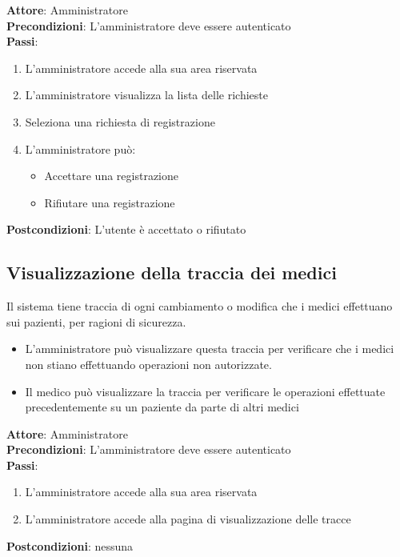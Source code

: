 \documentclass[a4paper]{article}
\begin{document}
\begin{mdframed}
	\textbf{Attore}: Amministratore\\
	\textbf{Precondizioni}: L'amministratore deve essere autenticato\\
	\textbf{Passi}: 
	\begin{enumerate}[nosep]
	  \item L'amministratore accede alla sua area riservata
	  \item L'amministratore visualizza la lista delle richieste
	  \item Seleziona una richiesta di registrazione
	  \item L'amministratore può:
	  \begin{itemize}
		  \item  Accettare una registrazione
		  \item  Rifiutare una registrazione
	  \end{itemize}
	\end{enumerate}
	\textbf{Postcondizioni}: L'utente è accettato o rifiutato
  \end{mdframed}

\subsection{Visualizzazione della traccia dei medici}

Il sistema tiene traccia di ogni cambiamento o modifica che i medici effettuano sui pazienti, per 
ragioni di sicurezza.

\begin{itemize}
	\item L'amministratore può visualizzare questa traccia per verificare 
	che i medici non stiano effettuando operazioni non autorizzate.
	\item Il medico può visualizzare la traccia per verificare le operazioni effettuate
	precedentemente su un paziente da parte di altri medici
\end{itemize}

\begin{mdframed}
	\textbf{Attore}: Amministratore\\
	\textbf{Precondizioni}: L'amministratore deve essere autenticato\\
	\textbf{Passi}: 
	\begin{enumerate}[nosep]
	  \item L'amministratore accede alla sua area riservata
	  \item L'amministratore accede alla pagina di visualizzazione delle tracce 
	\end{enumerate}
	\textbf{Postcondizioni}: nessuna
\end{mdframed}
\end{document}
